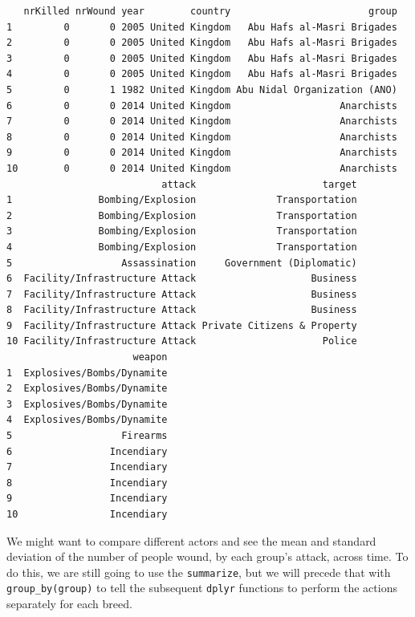 \documentclass[
  letterpaper,
  DIV=11,
  numbers=noendperiod]{scrreprt}
\newenvironment{Shaded}{\begin{snugshade}}{\end{snugshade}}
\newcommand{\AttributeTok}[1]{\textcolor[rgb]{0.40,0.45,0.13}{#1}}
\newcommand{\FunctionTok}[1]{\textcolor[rgb]{0.28,0.35,0.67}{#1}}
\newcommand{\NormalTok}[1]{\textcolor[rgb]{0.00,0.23,0.31}{#1}}
\newcommand{\SpecialCharTok}[1]{\textcolor[rgb]{0.37,0.37,0.37}{#1}}
\begin{document}
\begin{verbatim}
   nrKilled nrWound year        country                        group
1         0       0 2005 United Kingdom   Abu Hafs al-Masri Brigades
2         0       0 2005 United Kingdom   Abu Hafs al-Masri Brigades
3         0       0 2005 United Kingdom   Abu Hafs al-Masri Brigades
4         0       0 2005 United Kingdom   Abu Hafs al-Masri Brigades
5         0       1 1982 United Kingdom Abu Nidal Organization (ANO)
6         0       0 2014 United Kingdom                   Anarchists
7         0       0 2014 United Kingdom                   Anarchists
8         0       0 2014 United Kingdom                   Anarchists
9         0       0 2014 United Kingdom                   Anarchists
10        0       0 2014 United Kingdom                   Anarchists
                           attack                      target
1               Bombing/Explosion              Transportation
2               Bombing/Explosion              Transportation
3               Bombing/Explosion              Transportation
4               Bombing/Explosion              Transportation
5                   Assassination     Government (Diplomatic)
6  Facility/Infrastructure Attack                    Business
7  Facility/Infrastructure Attack                    Business
8  Facility/Infrastructure Attack                    Business
9  Facility/Infrastructure Attack Private Citizens & Property
10 Facility/Infrastructure Attack                      Police
                      weapon
1  Explosives/Bombs/Dynamite
2  Explosives/Bombs/Dynamite
3  Explosives/Bombs/Dynamite
4  Explosives/Bombs/Dynamite
5                   Firearms
6                 Incendiary
7                 Incendiary
8                 Incendiary
9                 Incendiary
10                Incendiary
\end{verbatim}

We might want to compare different actors and see the mean and standard
deviation of the number of people wound, by each group's attack, across
time. To do this, we are still going to use the \texttt{summarize}, but
we will precede that with \texttt{group\_by(group)} to tell the
subsequent \texttt{dplyr} functions to perform the actions separately
for each breed.

\begin{Shaded}
\end{Shaded}
\end{document}
